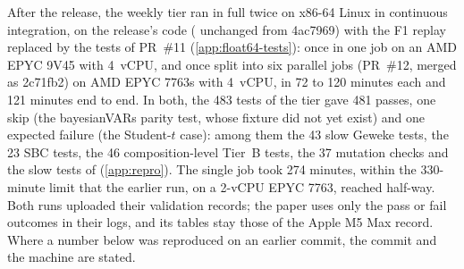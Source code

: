 After the release, the weekly tier ran in full twice on x86-64 Linux in continuous integration, on
the release's code ( unchanged from 4ac7969) with the F1 replay replaced by the tests of
PR~\#11 (\cref{app:float64-tests}): once in one job on an AMD EPYC 9V45 with 4~vCPU, and once
split into six parallel jobs (PR~\#12, merged as 2c71fb2) on AMD EPYC 7763s with 4~vCPU, in 72 to
120 minutes each and 121 minutes end to end. In both, the 483 tests of the tier
gave 481 passes, one skip (the bayesianVARs parity test, whose fixture did not yet exist) and one
expected failure (the  Student-$t$ case): among them the 43 slow Geweke tests, the 23
SBC tests, the 46 composition-level Tier~B tests, the 37 mutation checks and the slow tests of
 (\cref{app:repro}).
The single job took 274 minutes, within the 330-minute limit that the earlier run, on a 2-vCPU
EPYC 7763, reached half-way.
Both runs uploaded their validation records; the paper uses only the pass or fail outcomes in
their logs, and its tables stay those of the Apple M5 Max record.
Where a number below was reproduced on an earlier commit, the commit and the machine are stated.

